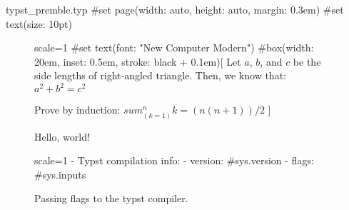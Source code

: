 \documentclass{article}
\begin{document}
\begin{filecontents*}[overwrite]{typst_premble.typ}
#set page(width: auto, height: auto, margin: 0.3em)
#set text(size: 10pt)
\end{filecontents*}

\begin{figure}[h]
    \centering
    \begin{typst}{scale=1}
    #set text(font: "New Computer Modern")
    #box(width: 20em, inset: 0.5em, stroke: black + 0.1em)[
        Let $a$, $b$, and $c$ be the side
        lengths of right-angled triangle.
        Then, we know that:
        $ a^2 + b^2 = c^2 $

        Prove by induction:
        $ sum_(k=1)^n k = (n(n+1)) / 2 $
    ]
    \end{typst}
    \caption{Hello, world!}
\end{figure}

\renewcommand{\typstflags}{--input a=b}
\begin{figure}[h]
    \centering
    \begin{typst}{scale=1}
        - Typst compilation info:
            - version: #sys.version
            - flags: #sys.inputs
    \end{typst}
    \caption{Passing flags to the typst compiler.}
\end{figure}
\end{document}
